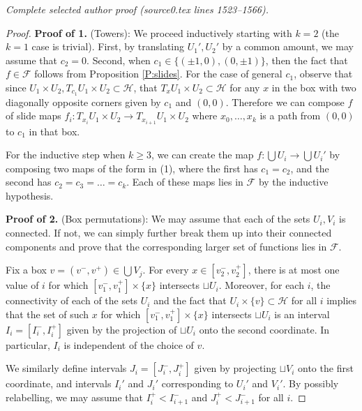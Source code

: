 \documentclass[10pt,a4paper]{amsart}
\newcommand{\X}{\times}
\newcommand{\scrF}{\mathcal{F}}
\newcommand{\scrH}{\mathcal{H}}
\newcommand{\sset}{\subset}
\begin{document}
\par\medskip\noindent\textit{Complete selected author proof (source0.tex lines 1523--1566).}\par\smallskip
\begin{proof}
	\textbf{Proof of 1.} (Towers):  \qquad We proceed inductively starting with $k = 2$ (the $k=1$ case is trivial). First, by translating $U_1', U_2'$ by a common amount, we may assume that $c_2 = 0$. Second, when $c_1 \in \{(\pm 1, 0), (0, \pm 1)\}$, then the fact that $f \in \scrF$ follows from Proposition \ref{P:slides}. For the case of general $c_1$, observe that since $U_1 \X U_2, T_{c_1} U_1 \X U_2 \sset \scrH$, that $T_x U_1 \X U_2 \sset \scrH$ for any $x$ in the box with two diagonally opposite corners given by $c_1$ and $(0, 0)$. Therefore we can compose $f$ of slide maps $f_i:T_{x_i} U_1 \X U_2 \to T_{x_{i+1}} U_1 \X U_2$ where $x_0, \dots, x_k$ is a path from $(0, 0)$ to $c_1$ in that box.
	
	For the inductive step when $k \ge 3$, we can create the map $f:\bigcup U_i \to \bigcup U_i'$ by composing two maps of the form in (1), where the first has $c_1 = c_2$, and the second has $c_2 = c_3 = \dots = c_k$. Each of these maps lies in $\scrF$ by the inductive hypothesis.
	
	\textbf{Proof of 2.} (Box permutations): \qquad  We may assume that each of the sets $U_i, V_i$ is connected. If not, we can simply further break them up into their connected components and prove that the corresponding larger set of functions lies in $\scrF$. 
	
	Fix a box $v = (v^-, v^+) \in \bigcup V_j$. For every $x \in [v^-_2, v^+_2]$, there is at most one value of $i$ for which $[v^-_1, v^+_1] \X \{x\}$ intersects $\sqcup U_i$. Moreover, for each $i$, the connectivity of each of the sets $U_i$ and the fact that $U_i \X \{v\} \sset \scrH$ for all $i$ implies that the set of such $x$ for which  $[v^-_1, v^+_1] \X \{x\}$ intersects $\sqcup U_i$ is an interval $I_i = [I_i^-, I_i^+]$ given by the projection of $\sqcup U_i$ onto the second coordinate. In particular, $I_i$ is independent of the choice of $v$.
	
	We similarly define intervals $J_i = [J_i^-, J_i^+]$ given by projecting $\sqcup V_i$ onto the first coordinate, and intervals $I_i'$ and $J_i'$ corresponding to $U_i'$ and $V_i'$. By possibly relabelling, we may assume that $I_i^+ < I^-_{i+1}$ and $J_i^+ < J^-_{i+1}$ for all $i$.
	

\end{proof}
\end{document}
